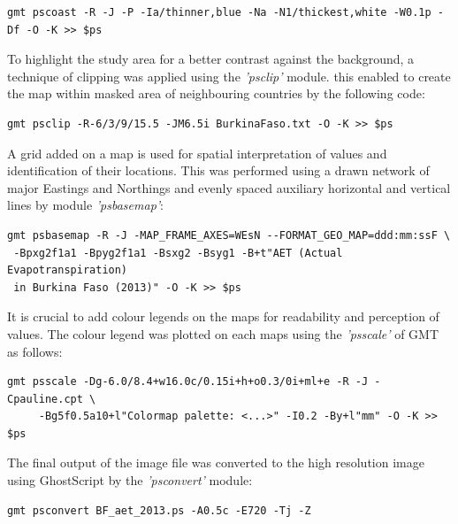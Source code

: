 \documentclass[atmosphere,article,submit,pdftex,moreauthors]{Definitions/mdpi}
\begin{document}
 \begin{small}
 \begin{verbatim}
gmt pscoast -R -J -P -Ia/thinner,blue -Na -N1/thickest,white -W0.1p -Df -O -K >> $ps
  \end{verbatim} 
 \end{small}
 
 To highlight the study area for a better contrast against the background, a technique of clipping was applied using the \emph{'psclip'} module. this enabled to create the map within masked area of neighbouring countries by the following code: 
 
\begin{small}
 \begin{verbatim}
gmt psclip -R-6/3/9/15.5 -JM6.5i BurkinaFaso.txt -O -K >> $ps
   \end{verbatim} 
 \end{small}
 
 A grid added on a map is used for spatial interpretation of values and identification of their locations. This was performed using a drawn network of major Eastings and Northings and evenly spaced auxiliary horizontal and vertical lines by module \emph{'psbasemap'}:
 
 \begin{small}
 \begin{verbatim}
gmt psbasemap -R -J -MAP_FRAME_AXES=WEsN --FORMAT_GEO_MAP=ddd:mm:ssF \
 -Bpxg2f1a1 -Bpyg2f1a1 -Bsxg2 -Bsyg1 -B+t"AET (Actual Evapotranspiration) 
 in Burkina Faso (2013)" -O -K >> $ps
     \end{verbatim} 
 \end{small}
 
It is crucial to add colour legends on the maps for readability and perception of values. The colour legend was plotted on each maps using the \emph{'psscale'} of GMT as follows: 
 
 \begin{small}
 \begin{verbatim}
gmt psscale -Dg-6.0/8.4+w16.0c/0.15i+h+o0.3/0i+ml+e -R -J -Cpauline.cpt \
     -Bg5f0.5a10+l"Colormap palette: <...>" -I0.2 -By+l"mm" -O -K >> $ps
    \end{verbatim} 
 \end{small}

The final output of the image file was converted to the high resolution image using GhostScript by the \emph{'psconvert'} module: 

\begin{small}
\begin{verbatim}
gmt psconvert BF_aet_2013.ps -A0.5c -E720 -Tj -Z
\end{verbatim} 
\end{small}
 
\end{document}
